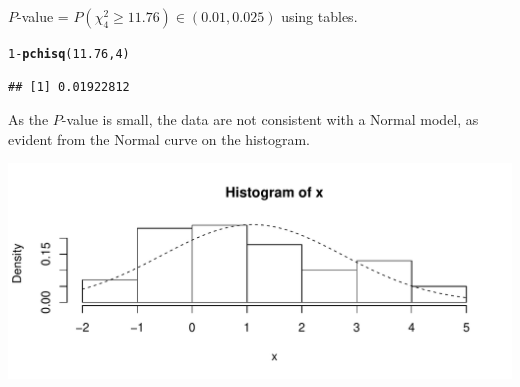 \documentclass[t,xcolor=pdftex,dvipsnames,table]{beamer}
\makeatletter
\def\maxwidth{ %
  \ifdim\Gin@nat@width>\linewidth
    \linewidth
  \else
    \Gin@nat@width
  \fi
}
\newcommand{\hlnum}[1]{\textcolor[rgb]{0.686,0.059,0.569}{#1}}%
\newcommand{\hlopt}[1]{\textcolor[rgb]{0,0,0}{#1}}%
\newcommand{\hlstd}[1]{\textcolor[rgb]{0.345,0.345,0.345}{#1}}%
\newcommand{\hlkwd}[1]{\textcolor[rgb]{0.737,0.353,0.396}{\textbf{#1}}}%
\newenvironment{kframe}{%
 \def\at@end@of@kframe{}%
 \ifinner\ifhmode%
  \def\at@end@of@kframe{\end{minipage}}%
  \begin{minipage}{\columnwidth}%
 \fi\fi%
 \def\FrameCommand##1{\hskip\@totalleftmargin \hskip-\fboxsep
 \colorbox{shadecolor}{##1}\hskip-\fboxsep
     \hskip-\linewidth \hskip-\@totalleftmargin \hskip\columnwidth}%
 \MakeFramed {\advance\hsize-\width
   \@totalleftmargin\z@ \linewidth\hsize
   \@setminipage}}%
 {\par\unskip\endMakeFramed%
 \at@end@of@kframe}
\newenvironment{knitrout}{}{} %
\makeatother
\begin{document}
\begin{frame}[fragile]{}
 $P$-value = $P( \chi^2_{4} \geq 11.76) \in (0.01,0.025) $ using tables.

\begin{knitrout}
\color{fgcolor}\begin{kframe}
\begin{alltt}
\hlnum{1}\hlopt{-}\hlkwd{pchisq}\hlstd{(}\hlnum{11.76}\hlstd{,}\hlnum{4}\hlstd{)}
\end{alltt}
\begin{verbatim}
## [1] 0.01922812
\end{verbatim}
\end{kframe}
\end{knitrout}

 As the $P$-value is small, the data are not consistent with a Normal model, as evident from the Normal curve on the histogram.


\begin{knitrout}
\color{fgcolor}
\includegraphics[width=\maxwidth]{figure/unnamed-chunk-20-1} 

\end{knitrout}

\end{frame} 
\end{document}
